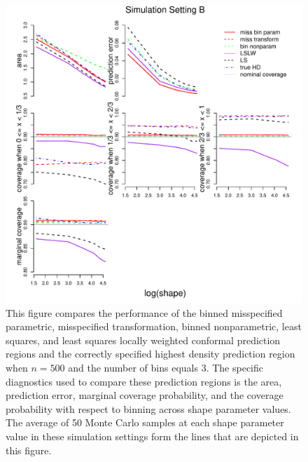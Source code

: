 \documentclass[11pt]{article}\usepackage[]{graphicx}\usepackage[]{color}
\makeatletter
\def\maxwidth{ %
  \ifdim\Gin@nat@width>\linewidth
    \linewidth
  \else
    \Gin@nat@width
  \fi
}
\newenvironment{knitrout}{}{} %
\makeatother
\begin{document}
\newpage
\begin{figure}[h!]
\begin{center}
\begin{knitrout}
\color{fgcolor}
\includegraphics[width=\maxwidth]{figure/Fig-misspec-500-1} 

\end{knitrout}
\end{center}
\caption{This figure compares the performance of the 
  binned misspecified parametric, 
  misspecified transformation, 
  binned nonparametric,
  least squares, and 
  least squares locally weighted conformal prediction regions and the 
  correctly specified highest density prediction region when $n = 500$ and the 
  number of bins equals 3.  
  The specific diagnostics used to compare these prediction regions is the 
    area,
    prediction error, 
    marginal coverage probability,     
    and the coverage probability with respect to binning  
    across shape parameter values.
  The average of 50 Monte Carlo samples at each shape parameter value in 
  these simulation settings form the lines that are depicted in this figure.}
\label{Fig:misspec.500}
\end{figure}
\end{document}
